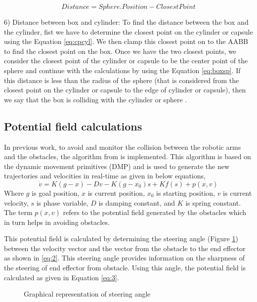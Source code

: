 \documentclass[a4paper, 11.5pt, conference]{ieeeconf}      %
\begin{document}
\begin{equation}
	Distance = Sphere.Position - ClosestPoint
	\label{eq:boxsp}
\end{equation}

6) Distance between box and cylinder:
To find the distance between the box and the cylinder, fist we have to determine the closest point on the cylinder or capsule using the Equation \ref{eq:cpcyl}. We then clamp this closest point on to the AABB to find the closest point on the box. Once we have the two closest points, we consider the closest point of the cylinder or capsule to be the center point of the sphere and continue with the calculations by using the Equation \ref{eq:boxsp}. If this distance is less than the radius of the sphere (that is considered from the closest point on the cylinder or capsule to the edge of cylinder or capsule), then we say that the box is colliding with the cylinder or sphere \cite{3ddet}.

\subsection{Potential field calculations}
In previous work, to avoid and monitor the collision between the robotic arms and the obstacles, the algorithm from \cite{Hoffmann} is implemented. This algorithm is based on the dynamic movement primitives (DMP) and is used to generate the new trajectories and velocities in real-time as given in below equations,
\begin{equation} \label{eq:1}
	\dot{v} = K ( g - x ) - D v - K (g - x_0) s + K f(s) + p(x, v)
\end{equation}
Where $g$ is goal position, $x$ is current position, $x_0$ is starting position, $v$ is current velocity, $s$ is phase variable, $D$ is damping constant, and $K$ is spring constant. The term $p(x,v)$ refers to the potential field generated by the obstacles which in turn helps in avoiding obstacles.

This potential field is calculated by determining the steering angle (Figure \ref{steering_image}) between the velocity vector and the vector from the obstacle to the end effector as shown in \ref{eq:2}. This steering angle provides information on the sharpness of the steering of end effector from obstacle. Using this angle, the potential field is calculated as given in Equation \ref{eq:3}.

\begin{figure}[H]
	\centering
	\caption{Graphical representation of steering angle \cite{Hoffmann}}
	\label{steering_image}
\end{figure}
\end{document}
